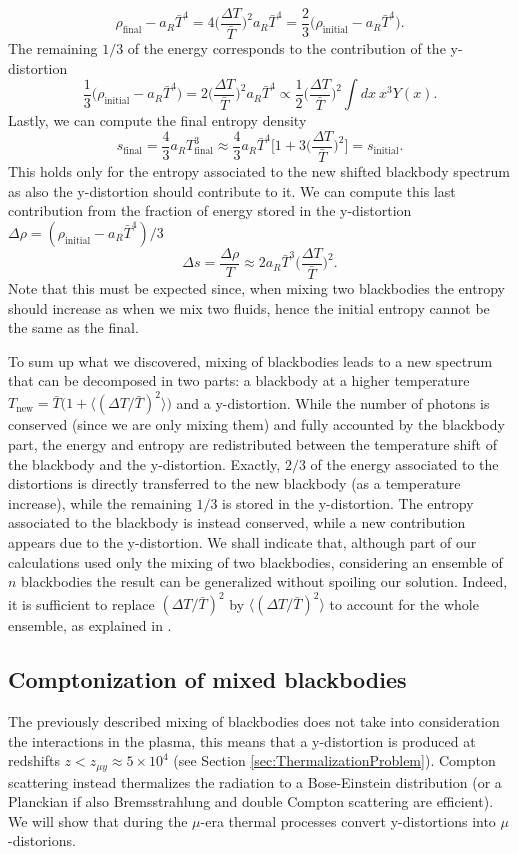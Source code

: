 $$\rho_\text{final}-a_R \bar T^4=4\bigg(\frac{\Delta T}{\bar T}\bigg)^2a_R\bar T^4=\frac{2}{3}\bigg(\rho_\text{initial}-a_R \bar T^4\bigg).$$
The remaining $1/3$ of the energy corresponds to the contribution of the y-distortion
$$\frac{1}{3}\bigg(\rho_\text{initial}-a_R \bar T^4\bigg)=2\bigg(\frac{\Delta T}{\bar T}\bigg)^2a_R\bar T^4\propto\frac{1}{2}\bigg(\frac{\Delta T}{\bar T}\bigg)^2\int dx\ x^3 Y(x).$$
Lastly, we can compute the final entropy density$$ s_\text{final}=\frac{4}{3}a_RT_\text{final}^3\approx\frac{4}{3}a_R \bar T^4\bigg[1+3\bigg(\frac{\Delta T}{\bar T}\bigg)^2\bigg]=s_\text{initial}.$$ This holds only for the entropy associated to the new shifted blackbody spectrum as also the y-distortion should contribute to it. We can compute this last contribution from the fraction of energy stored in the y-distortion $\Delta \rho = (\rho_\text{initial}-a_R \bar T^4)/3$
$$\Delta s=\frac{\Delta \rho}{T}\approx 2a_R \bar T^3\bigg(\frac{\Delta T}{\bar T}\bigg)^2.$$
Note that this must be expected since, when mixing two blackbodies the entropy should increase as when we mix two fluids, hence the initial entropy cannot be the same as the final.

To sum up what we discovered, mixing of blackbodies leads to a new spectrum that can be decomposed in two parts: a blackbody at a higher temperature $T_\text{new}=\bar T\big(1+\langle(\Delta T/\bar T)^2\rangle\big)$ and a y-distortion. While the number of photons is conserved (since we are only mixing them) and fully accounted by the blackbody part, the energy and entropy are redistributed between the temperature shift of the blackbody and the y-distortion. Exactly, $2/3$ of the energy associated to the distortions is directly transferred to the new blackbody (as a temperature increase), while the remaining $1/3$ is stored in the y-distortion. The entropy associated to the blackbody is instead conserved, while a new contribution appears due to the y-distortion. We shall indicate that, although part of our calculations used only the mixing of two blackbodies, considering an ensemble of $n$ blackbodies the result can be generalized without spoiling our solution. Indeed, it is sufficient to replace $(\Delta T/\bar T)^2$ by $\langle(\Delta T/\bar T)^2\rangle$ to account for the whole ensemble, as explained in \cite{MixingBB}.
\subsection{Comptonization of mixed blackbodies}
\label{sec:MixSD_Comportonization}
The previously described mixing of blackbodies does not take into consideration the interactions in the plasma, this means that a y-distortion is produced at redshifts $z<z_{\mu y}\approx 5\times 10^4$ (see Section \ref{sec:ThermalizationProblem}). Compton scattering instead thermalizes the radiation to a Bose-Einstein distribution (or a Planckian if also Bremsstrahlung and double Compton scattering are efficient). We will show that during the $\mu$-era thermal processes convert y-distortions into $\mu$-distorions. 


